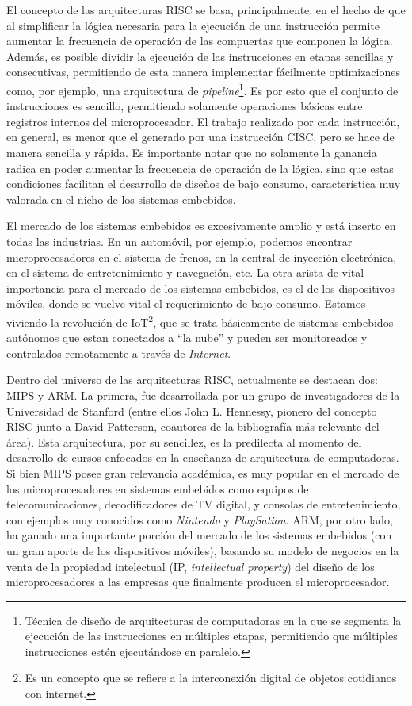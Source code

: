 El concepto de las arquitecturas RISC se basa, principalmente, en el hecho de que al simplificar la lógica necesaria para la ejecución de una instrucción permite aumentar la frecuencia de operación de las compuertas que componen la lógica. Además, es posible dividir la ejecución de las instrucciones en etapas sencillas y consecutivas, permitiendo de esta manera implementar fácilmente optimizaciones como, por ejemplo, una arquitectura de \emph{pipeline}\footnote{\label{Pipeline} Técnica de diseño de arquitecturas de computadoras en la que se segmenta la ejecución de las instrucciones en múltiples etapas, permitiendo que múltiples instrucciones estén ejecutándose en paralelo.}. Es por esto que el conjunto de instrucciones es sencillo, permitiendo solamente operaciones básicas entre registros internos del microprocesador. El trabajo realizado por cada instrucción, en general, es menor que el generado por una instrucción CISC, pero se hace de manera sencilla y rápida. Es importante notar que no solamente la ganancia radica en poder aumentar la frecuencia de operación de la lógica, sino que estas condiciones facilitan el desarrollo de diseños de bajo consumo, característica muy valorada en el nicho de los sistemas embebidos.

El mercado de los sistemas embebidos es excesivamente amplio y está inserto en todas las industrias. En un automóvil, por ejemplo, podemos encontrar microprocesadores en el sistema de frenos, en la central de inyección electrónica, en el sistema de entretenimiento y navegación, etc. La otra arista de vital importancia para el mercado de los sistemas embebidos, es el de los dispositivos móviles, donde se vuelve vital el requerimiento de bajo consumo. Estamos viviendo la revolución de IoT\footnote{\label{Internet of Things} Es un concepto que se refiere a la interconexión digital de objetos cotidianos con internet.}, que se trata básicamente de sistemas embebidos autónomos que estan conectados a ``la nube'' y pueden ser monitoreados y controlados remotamente a través de \emph{Internet}.

Dentro del universo de las arquitecturas RISC, actualmente se destacan dos: MIPS y ARM. La primera, fue desarrollada por un grupo de investigadores de la Universidad de Stanford (entre ellos John L. Hennessy, pionero del concepto RISC junto a David Patterson, coautores de la bibliografía más relevante del área). Esta arquitectura, por su sencillez, es la predilecta al momento del desarrollo de cursos enfocados en la enseñanza de arquitectura de computadoras. Si bien MIPS posee gran relevancia académica, es muy popular en el mercado de los microprocesadores en sistemas embebidos como equipos de telecomunicaciones, decodificadores de TV digital, y consolas de entretenimiento, con ejemplos muy conocidos como \emph{Nintendo} y \emph{PlaySation}. ARM, por otro lado, ha ganado una importante porción del mercado de los sistemas embebidos (con un gran aporte de los dispositivos móviles), basando su modelo de negocios en la venta de la propiedad intelectual (IP, \emph{intellectual property}) del diseño de los microprocesadores a las empresas que finalmente producen el microprocesador.


